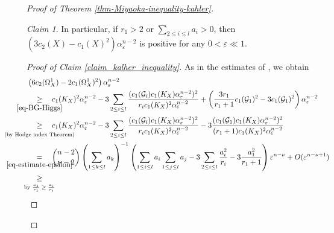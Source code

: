 \documentclass[12pt]{amsart}
\theoremstyle{definition}
\theoremstyle{remark}
\newtheorem{claim}[thm]{Claim}
\numberwithin{equation}{section}
\newcommand{\underalign}[2]{\quad \underset{\mathclap{\strut #1}}{#2}\quad}
\begin{document}
\begin{proof}[Proof of Theorem \ref{thm-Miyaoka-inequality-kahler}]
\begin{claim}
 In particular, if $r_1 >2$ or $\sum_{2\le i\le l} a_i >0$, then $\left(3c_2(X) -  c_1(X)^2 \right)\alpha_{ \varepsilon }^{n-2} $ is positive for any $0 < \varepsilon \ll 1$.
\end{claim}

\begin{proof}[Proof of Claim \ref{claim_kalher_inequality}]
As in the estimates of \cite[p. 25]{IM22}, we obtain 
\begin{align*}
\begin{split}
&\left(6c_2(\Omega_{X}^{1}) - 2 c_1(\Omega_{X}^{1})^2 \right)\alpha_{ \varepsilon }^{n-2} \\
&\underalign{\eqref{eq-BG-Higgs}}{\ge}
c_1(K_X)^2\alpha_{ \varepsilon }^{n-2} - 
3\sum_{2\le i\le l}\frac{(c_1(\mathcal{G}_i)c_1(K_X) \alpha_{ \varepsilon }^{n-2})^2}{r_ic_1(K_X)^2 \alpha_{ \varepsilon }^{n-2}}
+ \left( \frac{3 r_1}{r_1 + 1}c_{1}(\mathcal{G}_1)^{2}- 3 c_{1}(\mathcal{G}_1)^{2}\right)\alpha_{ \varepsilon }^{n-2} \\
&\underalign{\text{(by Hodge index Theorem)}}{\ge}
c_1(K_X)^2\alpha_{ \varepsilon }^{n-2} - 
3\sum_{2\le i\le l}\frac{(c_1(\mathcal{G}_i)c_1(K_X) \alpha_{ \varepsilon }^{n-2})^2}{r_ic_1(K_X)^2 \alpha_{ \varepsilon }^{n-2}}
-3\frac{(c_1(\mathcal{G}_1)c_1(K_X) \alpha_{ \varepsilon }^{n-2})^2}{(r_1 +1) c_1(K_X)^2 \alpha_{ \varepsilon }^{n-2}}  \\
&\underalign{\eqref{eq-estimate-epsilon}}{=}
\binom{n-2}{\nu-2} \left(\sum_{1\le k\le l} a_k \right)^{-1}
\left(\sum_{1\le i\le l} a_i \sum_{1\le j\le l} a_j - 3\sum_{2\le i\le l} \frac{a_{i}^{2}}{r_i} - 3\frac{a_{1}^{2}}{r_1 + 1}\right)\varepsilon ^{n-\nu}
+ O( \varepsilon ^{n-\nu+1}) \\
&\underalign{\text{by  $\frac{a_1}{r_1} \ge \frac{a_i}{r_i}$}}{\ge}

\end{split}
\end{align*}
\end{proof}
\end{proof}
\end{document}
